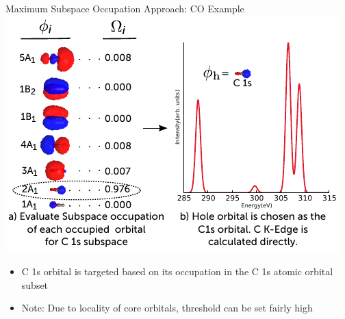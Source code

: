 \documentclass[t]{beamer}
\begin{document}
\begin{frame}{Maximum Subspace Occupation Approach: CO Example}
\centering
\includegraphics{CO_projection.pdf}
\begin{itemize}
\item C 1s orbital is targeted based on its occupation in the C 1s atomic orbital subset
\item Note: Due to locality of core orbitals, threshold can be set fairly high
\end{itemize}
\end{frame}
\end{document}
